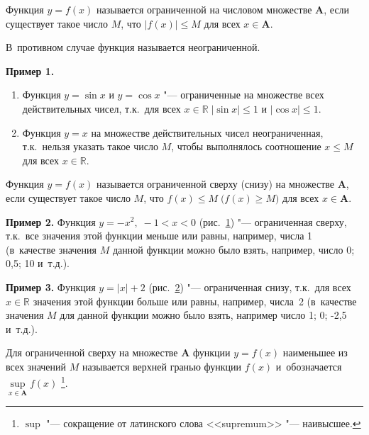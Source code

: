 \begin{Def}
Функция $y = f(x)$ называется ограниченной на числовом множестве $\mathbf{A}$,
если существует такое число $M$, что $|f(x)| \leqslant M$
для всех $x \in \mathbf{A}$.

В~противном случае функция называется неограниченной.
\end{Def}

\textbf{Пример 1.}
\begin{enumerate}
\item Функция $y = \sin x$ и $y = \cos x$ "--- ограниченные на множестве
всех действительных чисел, т.к.\ для всех
$x \in \mathbb{R} \; |\sin x| \leqslant 1$ и $|\cos x| \leqslant 1$.

\item Функция $y = x$ на множестве действительных чисел неограниченная,
т.к.\ нельзя указать такое число $M$, чтобы выполнялось соотношение
$x \leqslant M$ для всех $x \in \mathbb{R}$.
\end{enumerate}

\begin{Def}
Функция $y = f(x)$ называется ограниченной сверху (снизу) на множестве
$\mathbf{A}$, если существует такое число $M$, что
\linebreak ${f(x) \leqslant M \; \bigl( f(x) \geqslant M \bigr)}$
для всех $x \in \mathbf{A}$.
\end{Def}

\textbf{Пример 2.}
Функция $y = -x^{2}, \; -1 < x < 0$ (рис.\ \ref{fig_1_5_1}) "--- ограниченная сверху,
т.к.\ все значения этой функции меньше или равны, например, числа 1
(в~качестве значения $M$ данной функции можно было взять, например,
число 0; 0{,}5; 10 и~т.д.).

\begin{figure}\label{fig_1_5_1}
\end{figure}

\textbf{Пример 3.}
Функция $y = |x| + 2$ (рис.\ \ref{fig_1_5_2}) "--- ограниченная снизу,
т.к.\ для всех $x \in \mathbb{R}$ значения этой функции больше или равны,
например, числа~2 (в~качестве значения $M$ для данной функции можно было
взять, например число 1; 0; -2{,}5 и~т.д.).

\begin{figure}\label{fig_1_5_2}
\end{figure}

Для ограниченной сверху на множестве $\mathbf{A}$ функции $y = f(x)$
наименьшее из всех значений $M$ называется верхней гранью функции $f(x)$
и~обозначается $\sup\limits_{x \in \mathbf{A}} f(x)$
\footnote{$\sup$ "--- сокращение от латинского слова <<supremum>>
"--- наивысшее.}.

